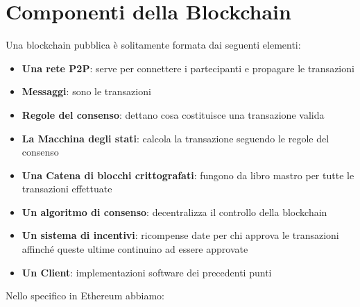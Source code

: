 \section{Componenti della Blockchain}

Una blockchain pubblica è solitamente formata dai seguenti elementi:

\begin{itemize}
      \item \textbf{Una rete P2P}: serve per connettere i partecipanti e propagare le transazioni
      \item \textbf{Messaggi}: sono le transazioni
      \item \textbf{Regole del consenso}: dettano cosa costituisce una transazione valida
      \item \textbf{La Macchina degli stati}: calcola la transazione seguendo le regole del consenso
      \item \textbf{Una Catena di blocchi crittografati}: fungono da libro mastro per tutte
            le transazioni effettuate
      \item \textbf{Un algoritmo di consenso}: decentralizza il controllo della blockchain
      \item \textbf{Un sistema di incentivi}: ricompense date per chi approva le transazioni
            affinché queste ultime continuino ad essere approvate
      \item \textbf{Un Client}: implementazioni software dei precedenti punti
\end{itemize}

Nello specifico in Ethereum abbiamo:


